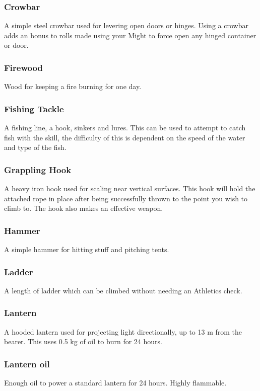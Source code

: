 \subsubsection*{Crowbar}
A simple steel crowbar used for levering open doors or hinges. Using a crowbar adds an  bonus to rolls made using your Might to force open any hinged container or door.

\subsubsection*{Firewood}
Wood for keeping a fire burning for one day.

\subsubsection*{Fishing Tackle}
A fishing line, a hook, sinkers and lures. This can be used to attempt to catch fish with the  skill, the difficulty of this is dependent on the speed of the water and type of the fish.

\subsubsection*{Grappling Hook}
A heavy iron hook used for scaling near vertical surfaces. This hook will hold the attached rope in place after being successfully thrown to the point you wish to climb to. The hook also makes an effective weapon.

\subsubsection*{Hammer}
A simple hammer for hitting stuff and pitching tents.

\subsubsection*{Ladder}
A length of ladder which can be climbed without needing an Athletics check.

\subsubsection*{Lantern}
A hooded lantern used for projecting  light directionally, up to 13 m from the bearer. This uses 0.5 kg of oil to burn for 24 hours.

\subsubsection*{Lantern oil}
Enough oil to power a standard lantern for 24 hours. Highly flammable.

